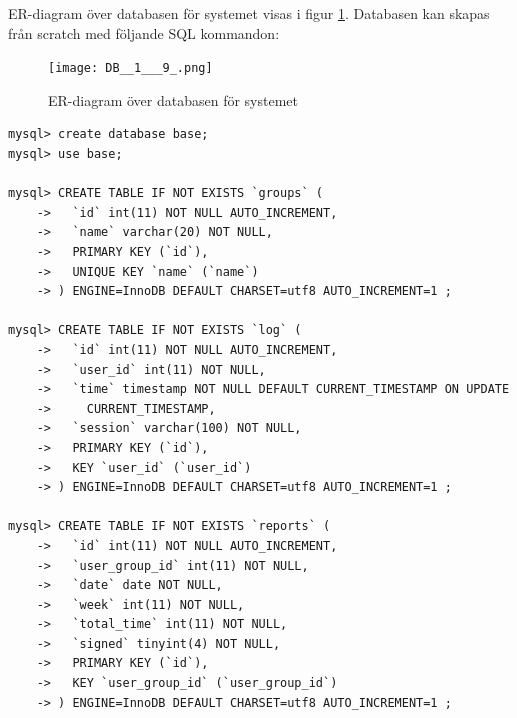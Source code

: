 \documentclass[a4paper]{article}
\begin{document}
ER-diagram över databasen för systemet visas i figur \ref{ER}. Databasen kan skapas från scratch med följande SQL kommandon: \\

\begin{figure}[ht!]
\centering
\texttt{[image: DB\_\_1\_\_\_9\_.png]}
\caption{ER-diagram över databasen för systemet \label{ER}}
\end{figure}

\begin{lstlisting}
mysql> create database base;
mysql> use base;

mysql> CREATE TABLE IF NOT EXISTS `groups` (
    ->   `id` int(11) NOT NULL AUTO_INCREMENT,
    ->   `name` varchar(20) NOT NULL,
    ->   PRIMARY KEY (`id`),
    ->   UNIQUE KEY `name` (`name`)
    -> ) ENGINE=InnoDB DEFAULT CHARSET=utf8 AUTO_INCREMENT=1 ;

mysql> CREATE TABLE IF NOT EXISTS `log` (
    ->   `id` int(11) NOT NULL AUTO_INCREMENT,
    ->   `user_id` int(11) NOT NULL,
    ->   `time` timestamp NOT NULL DEFAULT CURRENT_TIMESTAMP ON UPDATE
    ->     CURRENT_TIMESTAMP,
    ->   `session` varchar(100) NOT NULL,
    ->   PRIMARY KEY (`id`),
    ->   KEY `user_id` (`user_id`)
    -> ) ENGINE=InnoDB DEFAULT CHARSET=utf8 AUTO_INCREMENT=1 ;

mysql> CREATE TABLE IF NOT EXISTS `reports` (
    ->   `id` int(11) NOT NULL AUTO_INCREMENT,
    ->   `user_group_id` int(11) NOT NULL,
    ->   `date` date NOT NULL,
    ->   `week` int(11) NOT NULL,
    ->   `total_time` int(11) NOT NULL,
    ->   `signed` tinyint(4) NOT NULL,
    ->   PRIMARY KEY (`id`),
    ->   KEY `user_group_id` (`user_group_id`)
    -> ) ENGINE=InnoDB DEFAULT CHARSET=utf8 AUTO_INCREMENT=1 ;
    

\end{lstlisting}
\end{document}
